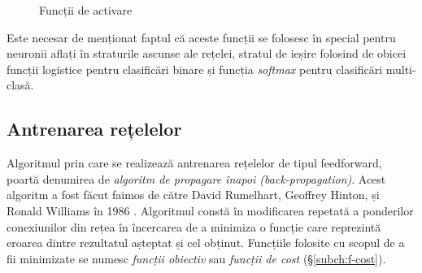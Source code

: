 \begin{figure}[ht]
\qquad
{}
\caption{Funcții de activare}\label{fig:sig+step+tanh+relu}
\end{figure}

Este necesar de menționat faptul că aceste funcții se folosesc în special pentru neuronii aflați în straturile ascunse ale rețelei, stratul de ieșire folosind de obicei funcții logistice pentru clasificări binare și funcția \textit{softmax} pentru clasificări multi-clasă.

\subsection{Antrenarea rețelelor}\label{subch:antrenare}
Algoritmul prin care se realizează antrenarea rețelelor de tipul feedforward, poartă denumirea de \textit{algoritm de propagare înapoi (back-propagation)}. Acest algoritm a fost făcut faimos de către David Rumelhart, Geoffrey Hinton, și Ronald Williams în 1986 \cite{Rumelhart1986}. Algoritmul constă în modificarea repetată a ponderilor conexiunilor din rețea în încercarea de a minimiza o funcție care reprezintă eroarea dintre rezultatul așteptat și cel obținut. Funcțiile folosite cu scopul de a fii minimizate se numesc \textit{funcții obiectiv} sau \textit{funcții de cost} (\S\ref{subch:f-cost}).


